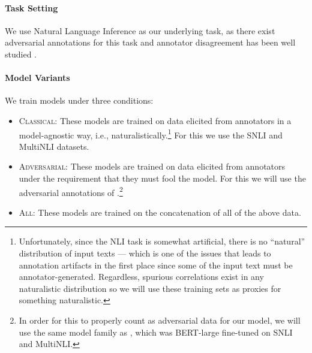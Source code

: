 \documentclass[10pt,a4paper]{article}
\newcommand{\ie}{i.e.}
\begin{document}
\paragraph{Task Setting}
We use Natural Language Inference \citep{dagan2005pascal,bowman2015large} as our underlying task, as there exist adversarial annotations for this task \citep{nie-etal-2020-adversarial,kiela-etal-2021-dynabench} and annotator disagreement has been well studied \citep{pavlick-kwiatkowski-2019-inherent,nie-bansal-2020-learn,zhang-de-marneffe-2021-identifying}.

\newcommand*{\classical}{\textsc{Classical}}
\newcommand*{\adversarial}{\textsc{Adversarial}}
\newcommand*{\all}{\textsc{All}}

\paragraph{Model Variants}
We train models under three conditions:
\begin{itemize}
\item \classical: These models are trained on data elicited from annotators in a model-agnostic way, \ie, naturalistically.\footnote{Unfortunately, since the NLI task is somewhat artificial, there is no ``natural'' distribution of input texts --- which is one of the issues that leads to annotation artifacts in the first place \citep{gururangan2018annotation} since some of the input text must be annotator-generated. Regardless, spurious correlations exist in any naturalistic distribution so we will use these training sets as proxies for something naturalistic.} For this we use the SNLI \citep{bowman2015large} and MultiNLI \citep{williams-etal-2018-broad} datasets.
\item \adversarial: These models are trained on data elicited from annotators under the requirement that they must fool the model. For this we will use the adversarial annotations of \citet{nie-etal-2020-adversarial}.\footnote{In order for this to properly count as adversarial data for our model, we will use the same model family as \citet{nie-etal-2020-adversarial}, which was BERT-large \citep{devlin2019bert} fine-tuned on SNLI and MultiNLI.}
\item \all: These models are trained on the concatenation of all of the above data.
\end{itemize}
\end{document}
